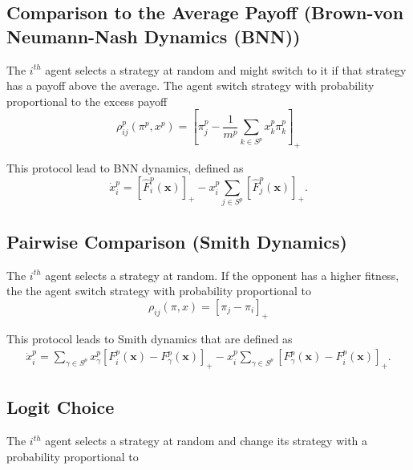 \documentclass[a4paper,10pt]{article}
\def\th{^{th}}
\newcommand{\bs}[1]{\boldsymbol{#1}}
\def\th{^{th}}
\begin{document}
\subsection{Comparison to the Average Payoff (Brown-von Neumann-Nash Dynamics (BNN))}

The $i\th$ agent selects a strategy at random and might switch to it if that strategy has a payoff above the average. The agent switch strategy with probability proportional to the excess payoff
%
\begin{equation}
\rho_{ij}^p(\pi^p, x^p) = \left[ \pi_j^p - \frac{1}{m^p} \sum_{k\in S^p} x_k^p \pi_k^p \right]_+
\end{equation}

This protocol lead to BNN dynamics, defined as 
\begin{equation}\label{eq:bnn}
 \dot{x}_i^p = \left[ \hat{F}_i^p \left( \bs{x} \right) \right]_+ - x_i^p  \sum_{j \in S^p} \left[ \hat{F}_j^p \left( \bs{x} \right) \right]_+.
\end{equation}

\subsection{Pairwise Comparison (Smith Dynamics)}

The $i\th$ agent selects a strategy at random. If the opponent has a higher fitness, the the agent switch strategy with probability proportional to
\begin{equation}
\rho_{ij}(\pi, x) = \left[ \pi_j - \pi_i \right]_+
\end{equation}

This protocol leads to Smith dynamics that are defined as 
%
\begin{multline} 
\dot{x}_i^p  = \sum_{\gamma \in S^p} x_\gamma^p  \left[ F_i^p \left( \bs{x} \right) - F_\gamma^p \left( \bs{x} \right) \right]_+ 
- x_i^p  \sum_{\gamma \in S^p} \left[ F_\gamma^p ( \bs{x}) - F_i^p( \bs{x} ) \right]_+.
\label{eq:smith}
\end{multline}



\subsection{Logit Choice}

The $i\th$ agent selects a strategy at random and change its strategy with a probability proportional to 
\end{document}
